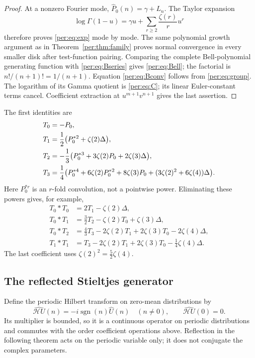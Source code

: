 \documentclass[11pt,letterpaper]{article}
\numberwithin{equation}{section}
\theoremstyle{plain}
\theoremstyle{definition}
\theoremstyle{remark}
\begin{document}
\begin{proof}
At a nonzero Fourier mode, $\widehat P_0(n)=\gamma+L_n$. The Taylor
expansion
\[
 \log\Gamma(1-u)=\gamma u+
                     \sum_{r\ge2}\frac{\zeta(r)}r u^r
\]
therefore proves \eqref{per:eq:exp} mode by mode. The same polynomial
growth argument as in Theorem~\ref{per:thm:family} proves normal
convergence in every smaller disk after test-function pairing. Comparing
the complete Bell-polynomial generating function with
\eqref{per:eq:Bseries} gives \eqref{per:eq:Bell}; the factorial is
$n!/(n+1)!=1/(n+1)$. Equation \eqref{per:eq:Bconv} follows from
\eqref{per:eq:group}. The logarithm of its Gamma quotient is
\eqref{per:eq:C}; its linear Euler-constant terms cancel. Coefficient
extraction at $u^{m+1}v^{n+1}$ gives the last assertion.
\end{proof}

The first identities are
\begin{align}
 T_0&=-P_0,\notag\\
 T_1&=\frac12\bigl(P_0^{*2}+\zeta(2)\Delta\bigr),
 \label{per:eq:T1}\\
 T_2&=-\frac13\bigl(P_0^{*3}+3\zeta(2)P_0+2\zeta(3)\Delta\bigr),
 \label{per:eq:T2}\\
 T_3&=\frac14\bigl(P_0^{*4}+6\zeta(2)P_0^{*2}
          +8\zeta(3)P_0+(3\zeta(2)^2+6\zeta(4))\Delta\bigr).
 \label{per:eq:T3}
\end{align}
Here $P_0^{*r}$ is an $r$-fold convolution, not a pointwise power.
Eliminating these powers gives, for example,
\begin{align}
 T_0*T_0&=2T_1-\zeta(2)\Delta,\label{per:eq:00}\\
 T_0*T_1&=\frac32T_2-\zeta(2)T_0+\zeta(3)\Delta,
 \label{per:eq:01}\\
 T_0*T_2&=\frac43T_3-2\zeta(2)T_1+2\zeta(3)T_0
                                      -2\zeta(4)\Delta,
 \label{per:eq:02}\\
 T_1*T_1&=T_3-2\zeta(2)T_1+2\zeta(3)T_0
                                      -\frac14\zeta(4)\Delta.
 \label{per:eq:11}
\end{align}
The last coefficient uses $\zeta(2)^2=\tfrac52\zeta(4)$.

\subsection{The reflected Stieltjes generator}

Define the periodic Hilbert transform on zero-mean distributions by
\begin{equation}\label{per:eq:Hilbert}
 \widehat{\mathcal H U}(n)=-i\operatorname{sgn}(n)\widehat U(n)
 \quad(n\ne0),\qquad \widehat{\mathcal H U}(0)=0.
\end{equation}
Its multiplier is bounded, so it is a continuous operator on periodic
distributions and commutes with the order coefficient operations above.
Reflection in the following theorem acts on the periodic variable only;
it does not conjugate the complex parameters.
\end{document}
